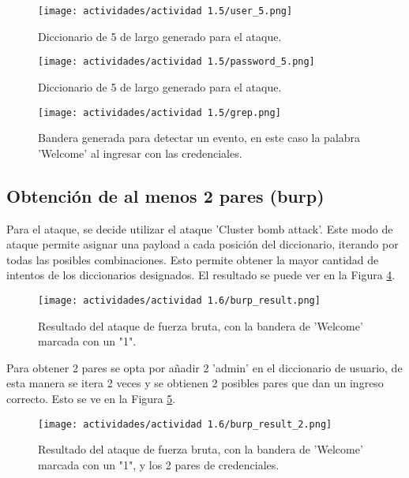 \documentclass[letter,12pt]{article}
\begin{document}
\begin{figure}[H]
    \centering
    \texttt{[image: actividades/actividad 1.5/user\_5.png]}
    \caption{Diccionario de 5 de largo generado para el ataque.}
    \label{actividad 1.5 user_5}
\end{figure}

\begin{figure}[H]
    \centering
    \texttt{[image: actividades/actividad 1.5/password\_5.png]}
    \caption{Diccionario de 5 de largo generado para el ataque.}
    \label{actividad 1.5 password_5}
\end{figure}

\begin{figure}[H]
    \centering
    \texttt{[image: actividades/actividad 1.5/grep.png]}
    \caption{Bandera generada para detectar un evento, en este caso la palabra 'Welcome' al ingresar con las credenciales.}
    \label{actividad 1.5 grep}
\end{figure}

\subsection{Obtención de al menos 2 pares (burp)}
Para el ataque, se decide utilizar el ataque 'Cluster bomb attack'. Este modo de ataque permite asignar una payload a cada posición del diccionario, iterando por todas las posibles combinaciones. Esto permite obtener la mayor cantidad de intentos de los diccionarios designados. El resultado se puede ver en la Figura \ref{actividad 1.6 burp_result}.

\begin{figure}[H]
    \centering
    \texttt{[image: actividades/actividad 1.6/burp\_result.png]}
    \caption{Resultado del ataque de fuerza bruta, con la bandera de 'Welcome' marcada con un "1".}
    \label{actividad 1.6 burp_result}
\end{figure}

Para obtener 2 pares se opta por añadir 2 'admin' en el diccionario de usuario, de esta manera se itera 2 veces y se obtienen 2 posibles pares que dan un ingreso correcto. Esto se ve en la Figura \ref{actividad 1.6 burp_result_2}. 

\begin{figure}[H]
    \centering
    \texttt{[image: actividades/actividad 1.6/burp\_result\_2.png]}
    \caption{Resultado del ataque de fuerza bruta, con la bandera de 'Welcome' marcada con un "1", y los 2 pares de credenciales.}
    \label{actividad 1.6 burp_result_2}
\end{figure}
\end{document}
